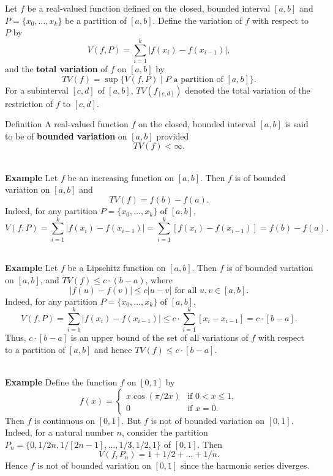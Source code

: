 Let $f$ be a real-valued function defined on the closed, bounded interval $[a,b]$ and $P=\{x_0,\dots,x_k\}$ be a partition of $[a,b]$.
Define the variation of $f$ with respect to $P$ by
\[
    V(f,P)=\sum_{i=1}^k|f(x_i)-f(x_{i-1})|,
\]
and the \textbf{total variation} of $f$ on $[a,b]$ by
\[
    TV(f)=\sup\{V(f,P)\mid P\text{ a partition of }[a,b]\}.
\]
For a subinterval $[c,d]$ of $[a,b]$, $TV(f_{[c,d]})$ denoted the total variation of the restriction of $f$ to $[c,d]$.
\begin{namedthm*}{Definition}
    A real-valued function $f$ on the closed, bounded interval $[a,b]$ is said to be of \textbf{bounded variation} on $[a,b]$ provided
    \[
        TV(f)<\infty.
    \]  
\end{namedthm*}
\begin{flushleft}
    
\ \\\textbf{Example }
Let $f$ be an increasing function on $[a,b]$.
Then $f$ is of bounded variation on $[a,b]$ and 
\[
    TV(f)=f(b)-f(a).
\]
Indeed, for any partition $P=\{x_0,\dots,x_k\}$ of $[a,b]$,
\[
    V(f,P)=\sum_{i=1}^k|f(x_i)-f(x_{i-1})|=\sum_{i=1}^k[f(x_i)-f(x_{i-1})]=f(b)-f(a).
\]  

\ \\\textbf{Example }
Let $f$ be a Lipschitz function on $[a,b]$.
Then $f$ is of bounded variation on $[a,b]$, and $TV(f)\le c\cdot(b-a)$, where 
\[
    |f(u)-f(v)|\le c|u-v|\text{ for all }u,v\in[a,b].
\]
Indeed, for any partition $P=\{x_0,\dots,x_k\}$ of $[a,b]$,
\[
    V(f,P)=\sum_{i=1}^k|f(x_i)-f(x_{i-1})|\le c\cdot\sum_{i=1}^k[x_i-x_{i-1}]=c\cdot[b-a].
\]  
Thus, $c\cdot[b-a]$ is an upper bound of the set of all variations of $f$ with respect to a partition of $[a,b]$ and hence $TV(f)\le c\cdot[b-a]$.

\ \\\textbf{Example }
Define the function $f$ on $[0,1]$ by
\[
    f(x)=\begin{cases}
        x\cos(\pi/2x)&\text{if }0<x\le1,\\
        0&\text{if }x=0.
    \end{cases}
\]
Then $f$ is continuous on $[0,1]$.
But $f$ is not of bounded variation on $[0,1]$.
Indeed, for a natural number $n$, consider the partition $P_n=\{0,1/2n,1/[2n-1],\dots,1/3,1/2,1\}$ of $[0,1]$.
Then 
\[
    V(f,P_n)=1+1/2+\dots+1/n.
\]
Hence $f$ is not of bounded variation on $[0,1]$ since the harmonic series diverges.

\end{flushleft}

